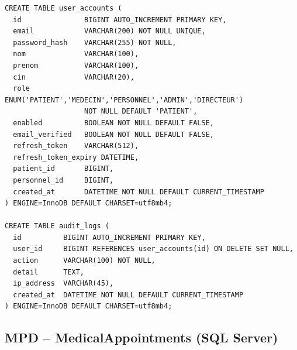 \begin{lstlisting}[style=sql, caption={Tables ms-auth}]
CREATE TABLE user_accounts (
  id               BIGINT AUTO_INCREMENT PRIMARY KEY,
  email            VARCHAR(200) NOT NULL UNIQUE,
  password_hash    VARCHAR(255) NOT NULL,
  nom              VARCHAR(100),
  prenom           VARCHAR(100),
  cin              VARCHAR(20),
  role             ENUM('PATIENT','MEDECIN','PERSONNEL','ADMIN','DIRECTEUR')
                   NOT NULL DEFAULT 'PATIENT',
  enabled          BOOLEAN NOT NULL DEFAULT FALSE,
  email_verified   BOOLEAN NOT NULL DEFAULT FALSE,
  refresh_token    VARCHAR(512),
  refresh_token_expiry DATETIME,
  patient_id       BIGINT,
  personnel_id     BIGINT,
  created_at       DATETIME NOT NULL DEFAULT CURRENT_TIMESTAMP
) ENGINE=InnoDB DEFAULT CHARSET=utf8mb4;

CREATE TABLE audit_logs (
  id          BIGINT AUTO_INCREMENT PRIMARY KEY,
  user_id     BIGINT REFERENCES user_accounts(id) ON DELETE SET NULL,
  action      VARCHAR(100) NOT NULL,
  detail      TEXT,
  ip_address  VARCHAR(45),
  created_at  DATETIME NOT NULL DEFAULT CURRENT_TIMESTAMP
) ENGINE=InnoDB DEFAULT CHARSET=utf8mb4;
\end{lstlisting}

\subsection{MPD -- MedicalAppointments (SQL Server)}

